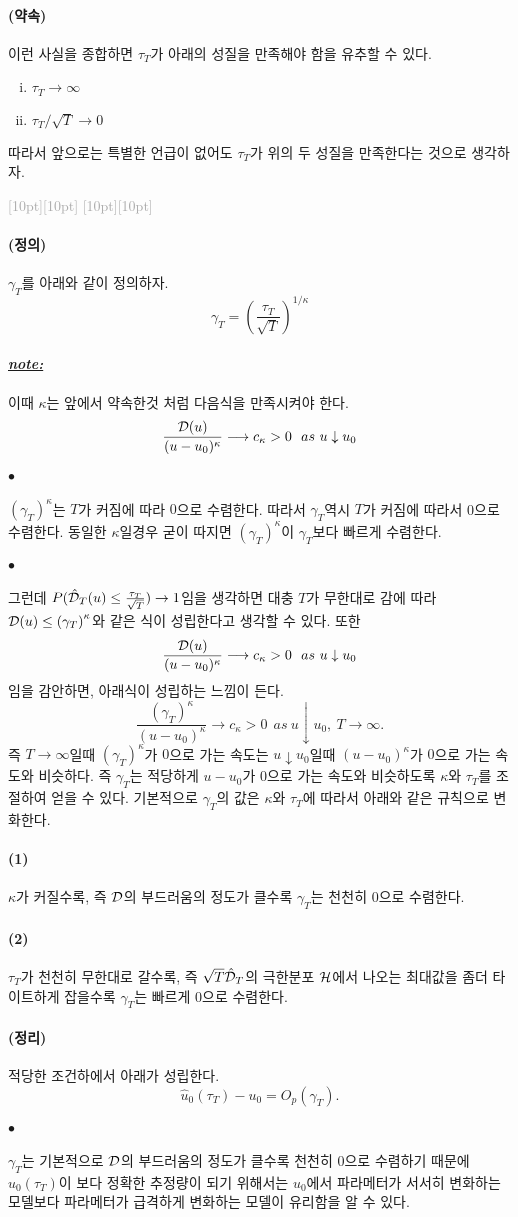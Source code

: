 \documentclass[12pt,oneside,english]{book}
\newcommand{\rdash}{\noindent \textcolor{darkgray}{ \raisebox{-1.9pt}[10pt][10pt]{\leafright} \hrulefill \raisebox{-1.9pt}[10pt][10pt]{\leafright \decofourleft \decothreeleft  \aldineright \decotwo \floweroneleft \decoone}}}
\def\ck{\paragraph{\LARGE$\bullet$}\LARGE}
\def\dfn{\paragraph{\LARGE(정의)}\LARGE}
\def\thm{\paragraph{\LARGE(정리)}\LARGE}
\def\promise{\paragraph{\LARGE(약속)}\LARGE}
\def\note{\paragraph{\LARGE\textit{\underline{note:}}}\LARGE}
\def\one{\paragraph{\LARGE(1)}\LARGE}
\def\two{\paragraph{\LARGE(2)}\LARGE}
\begin{document}
\promise 이런 사실을 종합하면 $\tau_T$가 아래의 성질을 만족해야 함을 유추할 수 있다. 
\begin{enumerate}[(i)]
\item  $\tau_T \longrightarrow \infty$ 
\item  $\tau_T/\sqrt{T} \longrightarrow 0$ 
\end{enumerate}
따라서 앞으로는 특별한 언급이 없어도 $\tau_T$가 위의 두 성질을 만족한다는 것으로 생각하자. 

\rdash 

\dfn
$\gamma_T$를 아래와 같이 정의하자. 
$$\gamma_T=\left(\frac{\tau_T}{\sqrt{T}}\right)^{1 / \kappa}$$

\note 이때 $\kappa$는 앞에서 약속한것 처럼 다음식을 만족시켜야 한다. 
$$\frac{{\cal D}(u)}{(u-u_0)^{\kappa}} \longrightarrow c_{\kappa} >0~~as~ u\downarrow u_0$$

\ck $\left(\gamma_T\right)^{\kappa}$는 $T$가 커짐에 따라 $0$으로 수렴한다. 따라서 $\gamma_T$역시 $T$가 커짐에 따라서 0으로 수렴한다. 동일한 $\kappa$일경우 굳이 따지면 $\left(\gamma_T\right)^{\kappa}$이 $\gamma_T$보다 빠르게 수렴한다. 

\ck 
그런데 $P(\hat{\cal D}_T(u)\leq \frac{\tau_T}{\sqrt{T}}) \rightarrow 1$임을 생각하면 대충 $T$가 무한대로 감에 따라 ${\cal D}(u)\leq \left(\gamma_T\right)^{\kappa}$와 같은 식이 성립한다고 생각할 수 있다. 또한 
$$\frac{{\cal D}(u)}{(u-u_0)^{\kappa}} \longrightarrow c_{\kappa} >0~~as~ u\downarrow u_0$$
임을 감안하면, 아래식이 성립하는 느낌이 든다. 
$$\frac{\left(\gamma_T\right)^{\kappa}}{(u-u_0)^{\kappa}} \longrightarrow c_{\kappa} >0~~as~ u\downarrow u_0,~T\rightarrow \infty.$$
즉 $T \rightarrow \infty$일때 $(\gamma_T)^{\kappa}$가 $0$으로 가는 속도는 $u\downarrow u_0$일때 $(u-u_0)^{\kappa}$가 $0$으로 가는 속도와 비슷하다. 즉 $\gamma_T$는 적당하게 $u-u_0$가 $0$으로 가는 속도와 비슷하도록 $\kappa$와 $\tau_T$를 조절하여 얻을 수 있다. 기본적으로 $\gamma_T$의 값은 $\kappa$와 $\tau_T$에 따라서 아래와 같은 규칙으로 변화한다. 

\one $\kappa$가 커질수록, 즉 $\cal D$의 부드러움의 정도가 클수록 $\gamma_T$는 천천히 0으로 수렴한다. 

\two $\tau_T$가 천천히 무한대로 갈수록, 즉 $\sqrt{T}\hat{\cal D}_T$의 극한분포 $\cal H$에서 나오는 최대값을 좀더 타이트하게 잡을수록 $\gamma_T$는 빠르게 0으로 수렴한다. 

\thm 적당한 조건하에서 아래가 성립한다. 
$$\hat{u}_0(\tau_T)-u_0=O_p(\gamma_T).$$

\ck $\gamma_T$는 기본적으로 $\cal D$의 부드러움의 정도가 클수록 천천히 0으로 수렴하기 때문에 $\hat{u}_0(\tau_T)$이 보다 정확한 추정량이 되기 위해서는 $u_0$에서 파라메터가 서서히 변화하는 모델보다 파라메터가 급격하게 변화하는 모델이 유리함을 알 수 있다. 
\end{document}
